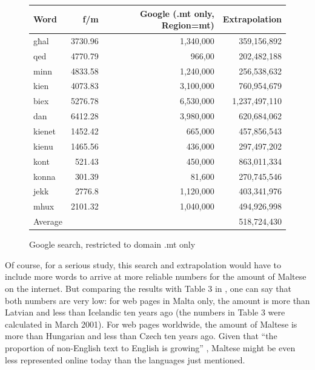 \documentclass[]{../../metanetpaper}
\begin{document}
\begin{multicols}{2}
\begin{figure}[tb]
\setlength{\tabcolsep}{2.5em}
\begin{tabularx}{\textwidth}{lrrr} \toprule\addlinespace
Word & f/m & Google (.mt only, Region=mt) & Extrapolation \\
\hline
għal & 3730.96 & 1,340,000 & 359,156,892 \\
qed	& 4770.79 & 966,00  &  202,482,188  \\
minn & 4833.58 & 1,240,000  &  256,538,632 \\
kien & 4073.83 & 3,100,000  &  760,954,679 \\
biex & 5276.78 & 6,530,000  & 1,237,497,110 \\
dan	& 6412.28  & 3,980,000  & 620,684,062  \\
kienet & 1452.42  & 665,000 &  457,856,543 \\
kienu & 1465.56  & 436,000  & 297,497,202  \\
kont & 521.43  & 450,000  &  863,011,334 \\
konna & 301.39  & 81,600  &   270,745,546\\
jekk & 2776.8  &  1,120,000 & 403,341,976 \\
mhux & 2101.32  & 1,040,000  &  494,926,998 \\
\hline
Average& & & 518,724,430 \\
\hline
\end{tabularx}
\caption{Google search, restricted to domain .mt only}
\label{table:Google_B_en}
\end{figure}

Of course, for a serious study, this search and extrapolation would have to include more words to arrive at more reliable numbers for the amount of Maltese on the internet. But comparing the results with Table 3 in \cite{Kilgarriff-Grefenstette:2003}, one can say that both numbers are very low: for web pages in Malta only, the amount is more than Latvian and less than Icelandic ten years ago (the numbers in Table 3 were calculated in March 2001). For web pages worldwide, the amount of Maltese is more than Hungarian and less than Czech ten years ago. Given that ``the proportion of non-English text to English is growing'' \cite{Kilgarriff-Grefenstette:2003}, Maltese might be even less represented online today than the languages just mentioned.


\end{multicols}
\end{document}
